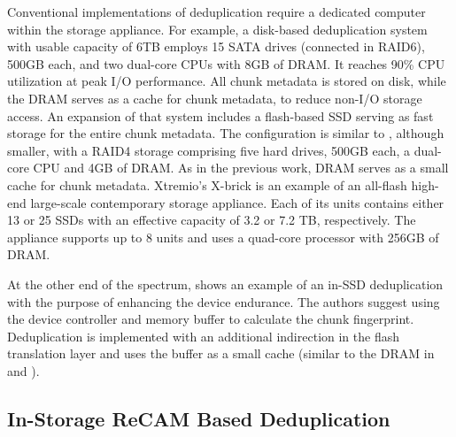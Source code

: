 \documentclass{superfri}
\begin{document}
Conventional implementations of deduplication require a dedicated computer within the storage appliance. For example, a disk-based deduplication system \cite{zhu2008avoiding} with usable capacity of 6TB employs 15 SATA drives (connected in RAID6), 500GB each, and two dual-core CPUs with 8GB of DRAM. It reaches 90\% CPU utilization at peak I/O performance. All chunk metadata is stored on disk, while the DRAM serves as a cache for chunk metadata, to reduce non-I/O storage access. An expansion of that system \cite{debnath2010chunkstash} includes a flash-based SSD serving as fast storage for the entire chunk metadata. The configuration is similar to \cite{zhu2008avoiding}, although smaller, with a RAID4 storage comprising five hard drives, 500GB each, a dual-core CPU and 4GB of DRAM. As in the previous work, DRAM serves as a small cache for chunk metadata.  Xtremio's X-brick \cite{XbrickSpec} is an example of an all-flash high-end large-scale contemporary storage appliance. Each of its units contains either 13 or 25 SSDs with an effective capacity of 3.2 or 7.2 TB, respectively. The appliance supports up to 8 units and uses a quad-core processor with 256GB of DRAM. 

At the other end of the spectrum, \cite{chen2011caftl} shows an example of an in-SSD deduplication with the purpose of enhancing the device endurance. The authors suggest using the device controller and memory buffer to calculate the chunk fingerprint. Deduplication is implemented with an additional indirection in the flash translation layer and uses the buffer as a small cache (similar to the DRAM in \cite{debnath2010chunkstash} and \cite{zhu2008avoiding}). 


\subsection{In-Storage ReCAM Based Deduplication}
\end{document}
